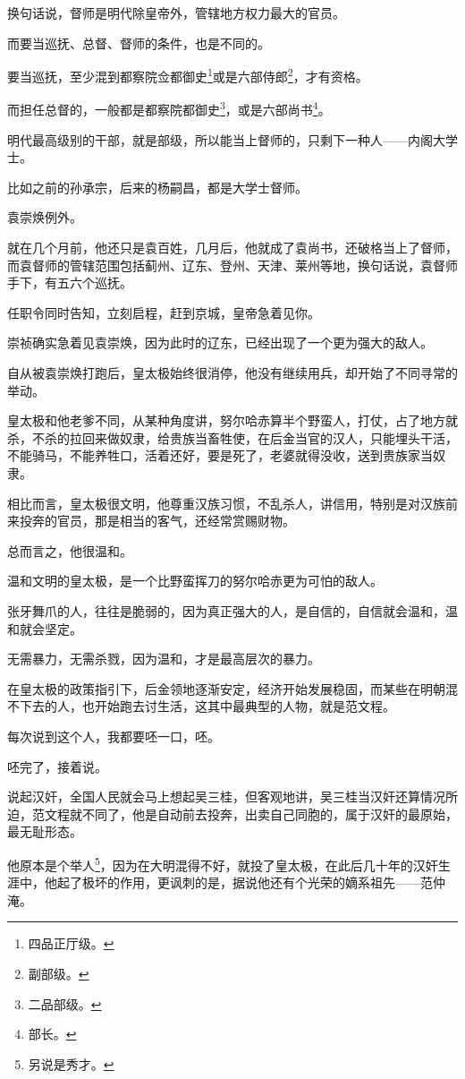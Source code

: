 \begin{multicols}{\theparacolNo}
换句话说，督师是明代除皇帝外，管辖地方权力最大的官员。

而要当巡抚、总督、督师的条件，也是不同的。

要当巡抚，至少混到都察院佥都御史\footnote{四品正厅级。}或是六部侍郎\footnote{副部级。}，才有资格。

而担任总督的，一般都是都察院都御史\footnote{二品部级。}，或是六部尚书\footnote{部长。}。

明代最高级别的干部，就是部级，所以能当上督师的，只剩下一种人——内阁大学士。

比如之前的孙承宗，后来的杨嗣昌，都是大学士督师。

袁崇焕例外。

就在几个月前，他还只是袁百姓，几月后，他就成了袁尚书，还破格当上了督师，而袁督师的管辖范围包括蓟州、辽东、登州、天津、莱州等地，换句话说，袁督师手下，有五六个巡抚。

任职令同时告知，立刻启程，赶到京城，皇帝急着见你。

崇祯确实急着见袁崇焕，因为此时的辽东，已经出现了一个更为强大的敌人。

自从被袁崇焕打跑后，皇太极始终很消停，他没有继续用兵，却开始了不同寻常的举动。

皇太极和他老爹不同，从某种角度讲，努尔哈赤算半个野蛮人，打仗，占了地方就杀，不杀的拉回来做奴隶，给贵族当畜牲使，在后金当官的汉人，只能埋头干活，不能骑马，不能养牲口，活着还好，要是死了，老婆就得没收，送到贵族家当奴隶。

相比而言，皇太极很文明，他尊重汉族习惯，不乱杀人，讲信用，特别是对汉族前来投奔的官员，那是相当的客气，还经常赏赐财物。

总而言之，他很温和。

温和文明的皇太极，是一个比野蛮挥刀的努尔哈赤更为可怕的敌人。

张牙舞爪的人，往往是脆弱的，因为真正强大的人，是自信的，自信就会温和，温和就会坚定。

无需暴力，无需杀戮，因为温和，才是最高层次的暴力。

在皇太极的政策指引下，后金领地逐渐安定，经济开始发展稳固，而某些在明朝混不下去的人，也开始跑去讨生活，这其中最典型的人物，就是范文程。

每次说到这个人，我都要呸一口，呸。

呸完了，接着说。

说起汉奸，全国人民就会马上想起吴三桂，但客观地讲，吴三桂当汉奸还算情况所迫，范文程就不同了，他是自动前去投奔，出卖自己同胞的，属于汉奸的最原始，最无耻形态。

他原本是个举人\footnote{另说是秀才。}，因为在大明混得不好，就投了皇太极，在此后几十年的汉奸生涯中，他起了极坏的作用，更讽刺的是，据说他还有个光荣的嫡系祖先——范仲淹。


\end{multicols}
